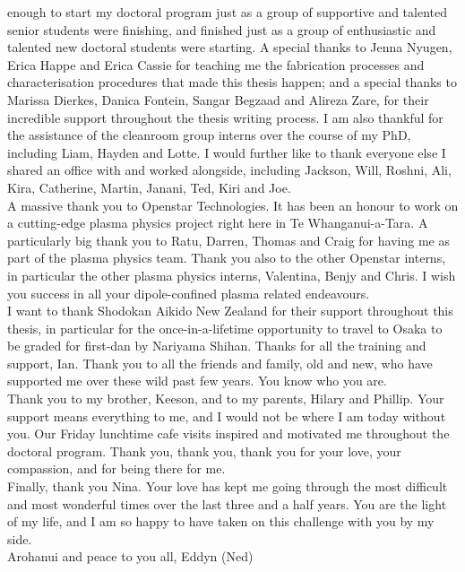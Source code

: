 \documentclass[
  a4paper,
]{scrbook}
\begin{document}
enough to start my doctoral program just as a group of supportive and talented senior students were finishing, and finished just as a group of enthusiastic and talented new doctoral students were starting. A special thanks to Jenna Nyugen, Erica Happe and Erica Cassie for teaching me the fabrication processes and characterisation procedures that made this thesis happen; and a special thanks to Marissa Dierkes, Danica Fontein, Sangar Begzaad and Alireza Zare, for their incredible support throughout the thesis writing process. I am also thankful for the assistance of the cleanroom group interns over the course of my PhD, including Liam, Hayden and Lotte. I would further like to thank everyone else I shared an office with and worked alongside, including Jackson, Will, Roshni, Ali, Kira, Catherine, Martin, Janani, Ted, Kiri and Joe. \\[5pt] A massive thank you to Openstar Technologies. It has been an honour to work on a cutting-edge plasma physics project right here in Te Whanganui-a-Tara. A particularly big thank you to Ratu, Darren, Thomas and Craig for having me as part of the plasma physics team. Thank you also to the other Openstar interns, in particular the other plasma physics interns, Valentina, Benjy and Chris. I wish you success in all your dipole-confined plasma related endeavours. \\[5pt] I want to thank Shodokan Aikido New Zealand for their support throughout this thesis, in particular for the once-in-a-lifetime opportunity to travel to Osaka to be graded for first-dan by Nariyama Shihan. Thanks for all the training and support, Ian. Thank you to all the friends and family, old and new, who have supported me over these wild past few years. You know who you are. \\[5pt] Thank you to my brother, Keeson, and to my parents, Hilary and Phillip. Your support means everything to me, and I would not be where I am today without you. Our Friday lunchtime cafe visits inspired and motivated me throughout the doctoral program. Thank you, thank you, thank you for your love, your compassion, and for being there for me. \\[5pt] Finally, thank you Nina. Your love has kept me going through the most difficult and most wonderful times over the last three and a half years. You are the light of my life, and I am so happy to have taken on this challenge with you by my side. \\[5pt] Arohanui and peace to you all, Eddyn (Ned)

\fancyhf{} %
\thispagestyle{fancy} %
\renewcommand{\headrulewidth}{0pt}
\fancyfoot[R]{\thepage} %
\end{document}

